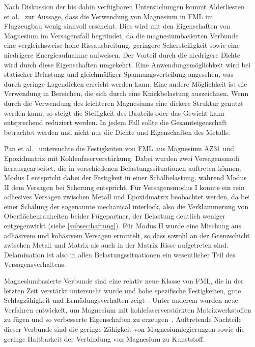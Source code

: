 Nach Diskussion der bis dahin verfügbaren Untersuchungen kommt Alderliesten et al.~\cite{Alderliesten.2008} zur Aussage, dass die Verwendung von Magnesium in FML im Flugzeugbau wenig sinnvoll erscheint.
Dies wird mit den Eigenschaften von Magnesium im Versagensfall begründet, da die magnesiumbasierten Verbunde eine vergleichsweise hohe Rissausbreitung, geringere Schersteifigkeit sowie eine niedrigere Energieaufnahme aufweisen.
Der Vorteil durch die niedrigere Dichte wird durch diese Eigenschaften umgekehrt.
Eine Anwendungsmöglichkeit wird bei statischer Belastung und gleichmäßiger Spannungsverteilung angesehen, was durch geringe Lagendicken erreicht werden kann.
Eine andere Möglichkeit ist die Verwendung in Bereichen, die sich durch eine Knickbelastung auszeichnen.
Wenn durch die Verwendung des leichteren Magnesiums eine dickere Struktur genutzt werden kann, so steigt die Steifigkeit des Bauteils oder das Gewicht kann entsprechend reduziert werden.
In jedem Fall sollte die Gesamteigenschaft betrachtet werden und nicht nur die Dichte und Eigenschaften des Metalls.\cite{Alderliesten.2008}

Pan et al.~\cite{Pan.2016} untersuchte die Festigkeiten von FML aus Magnesium AZ31 und Epoxidmatrix mit Kohlenfaserverstärkung.
Dabei wurden zwei Versagensmodi herausgearbeitet, die in verschiedenen Belastungssituationen auftreten können.
Modus I entspricht dabei der Festigkeit in einer Schälbelastung, während Modus II dem Versagen bei Scherung entspricht.
Für Versagensmodus I konnte ein rein adhesives Versagen zwischen Metall und Epoxidmatrix beobachtet werden, da bei einer Schälung der sogenannte mechanical interlock, also die Verklammerung von Oberflächenrauheiten beider Fügepartner, der Belastung deutlich weniger entgegenwirkt (siehe \autoref{subsec:haftung}).
Für Modus II wurde eine Mischung aus adhäsivem und kohäsivem Versagen ermittelt, so dass sowohl an der Grenzschicht zwischen Metall und Matrix als auch in der Matrix Risse aufgetreten sind.
Delamination ist also in allen Belastungssituationen ein wesentlicher Teil des Versagensverhaltens.

Magnesiumbasierte Verbunde sind eine relativ neue Klasse von FML, die in der letzten Zeit verstärkt untersucht wurde und hohe spezifische Festigkeiten, gute Schlagzähigkeit und Ermüdungsverhalten zeigt~\cite{Cicco.2019}.
Unter anderem wurden neue Verfahren entwickelt, um Magnesium mit kohlefaserverstärkten Matrixwerkstoffen zu fügen und so verbesserte Eigenschaften zu erzeugen~\cite{Pan.2017}.
Auftretende Nachteile dieser Verbunde sind die geringe Zähigkeit von Magnesiumlegierungen sowie die geringe Haltbarkeit der Verbindung von Magnesium zu Kunststoff.


